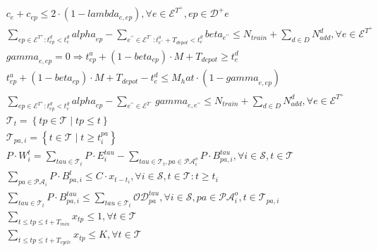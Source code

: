 \begin{align}
  & c_{e} + c_{ep} \leq 2 \cdot \left(1 - \mathit{lambda}_{e , ep}\right) , \forall e \in \mathcal{E}^{T^{+}} , ep \in \mathcal{D}^{+} e \tag{eq\_0035} \\
  & \underset{ep \in \mathcal{E}^{T^{+}} : t_{ep}^{d} < t_{e}^{d}}{\sum} \mathit{alpha}_{ep} - \underset{e^{' '} \in \mathcal{E}^{T^{-}} : t_{e^{' '}}^{a} + T_{d e p o t} < t_{e}^{d}}{\sum} \mathit{beta}_{e^{' '}} \leq N_{t r a i n} + \sum_{d \in D} N_{a d d}^{d} , \forall e \in \mathcal{E}^{T^{+}} \tag{eq\_0036} \\
  & \mathit{gamma}_{e , ep} = 0 \Rightarrow t_{ep}^{a} + \left(1 - \mathit{beta}_{ep}\right) \cdot M + T_{d e p o t} \geq t_{e}^{d} \tag{eq\_0038} \\
  & t_{ep}^{a} + \left(1 - \mathit{beta}_{ep}\right) \cdot M + T_{d e p o t} - t_{e}^{d} \leq M_hat \cdot \left(1 - \mathit{gamma}_{e , ep}\right) \tag{eq\_0039} \\
  & \underset{ep \in \mathcal{E}^{T^{+}} : t_{ep}^{d} < t_{e}^{d}}{\sum} \mathit{alpha}_{ep} - \underset{e^{' '} \in \mathcal{E}^{T^{-}}}{\sum} \mathit{gamma}_{e , e^{' '}} \leq N_{t r a i n} + \sum_{d \in D} N_{a d d}^{d} , \forall e \in \mathcal{E}^{T^{+}} \tag{eq\_0040} \\
  & \mathcal{T}_{t} = \left\{tp \in \mathcal{T} \mid tp \leq t\right\} \tag{eq\_0041} \\
  & \mathcal{T}_{p a , i} = \left\{t \in \mathcal{T} \mid t \geq t_{i}^{p a}\right\} \tag{eq\_0043} \\
  & P \cdot W_{i}^{t} = \sum_{\mathit{tau} \in \mathcal{T}_{t}} P \cdot E_{i}^{\mathit{tau}} - \sum_{\mathit{tau} \in \mathcal{T}_{t}, p a \in \mathcal{PA}_{i}^{o}} P \cdot B_{p a , i}^{\mathit{tau}} , \forall i \in \mathcal{S} , t \in \mathcal{T} \tag{eq\_0050} \\
  & \sum_{p a \in \mathcal{PA}_{i}} P \cdot B_{p a , i}^{t} \leq C \cdot x_{t - t_{i}} , \forall i \in \mathcal{S} , t \in \mathcal{T} : t \geq t_{i} \tag{eq\_0052} \\
  & \sum_{\mathit{tau} \in \mathcal{T}_{t}} P \cdot B_{p a , i}^{\mathit{tau}} \leq \sum_{\mathit{tau} \in \mathcal{T}_{t}} \mathcal{OD}_{p a}^{\mathit{tau}} , \forall i \in \mathcal{S} , p a \in \mathcal{PA}_{i}^{o} , t \in \mathcal{T}_{p a , i} \tag{eq\_0053} \\
  & \sum_{t \leq tp \leq t + T_{m i n}} x_{tp} \leq 1 , \forall t \in \mathcal{T} \tag{eq\_0054} \\
  & \sum_{t \leq tp \leq t + T_{c y c l e}} x_{tp} \leq K , \forall t \in \mathcal{T} \tag{eq\_0056} \\

\end{align}

